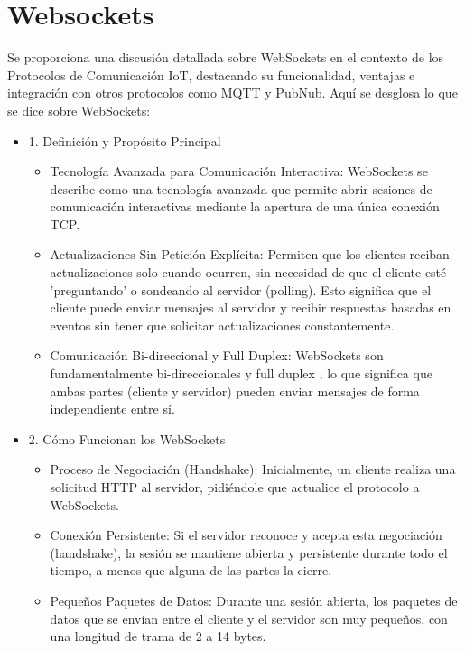 \documentclass{report}
\begin{document}
\section{Websockets}
Se proporciona una discusión detallada sobre  WebSockets en el contexto de los  Protocolos de Comunicación IoT, 
destacando su funcionalidad, ventajas e integración con otros protocolos como MQTT y PubNub.
Aquí se desglosa lo que se  dice sobre WebSockets:
\begin{itemize}
    \item 1. Definición y Propósito Principal
    \begin{itemize}
        \item  Tecnología Avanzada para Comunicación Interactiva: WebSockets se describe como una tecnología avanzada que permite 
        abrir sesiones de comunicación interactivas mediante la apertura de una única conexión TCP.
        \item  Actualizaciones Sin Petición Explícita: Permiten que los clientes reciban actualizaciones solo cuando ocurren, sin 
        necesidad de que el cliente esté 'preguntando' o sondeando al servidor  (polling). Esto significa que el cliente puede enviar 
        mensajes al servidor y recibir respuestas basadas en eventos sin tener que solicitar actualizaciones constantemente.
        \item  Comunicación Bi-direccional y Full Duplex: WebSockets son fundamentalmente  bi-direccionales y full duplex , lo que 
        significa que ambas partes (cliente y servidor) pueden enviar mensajes de forma independiente entre sí.
    \end{itemize}

    \item 2. Cómo Funcionan los WebSockets
    \begin{itemize}
        \item Proceso de Negociación (Handshake): Inicialmente, un cliente realiza una solicitud HTTP al servidor, pidiéndole 
        que actualice el protocolo a WebSockets.
        \item Conexión Persistente: Si el servidor reconoce y acepta esta negociación (handshake), la sesión se mantiene abierta 
        y persistente durante todo el tiempo, a menos que alguna de las partes la cierre.
        \item Pequeños Paquetes de Datos: Durante una sesión abierta, los paquetes de datos que se envían entre el cliente y el 
        servidor son muy pequeños, con una longitud de trama de 2 a 14 bytes.
    \end{itemize}


\end{itemize}
\end{document}
